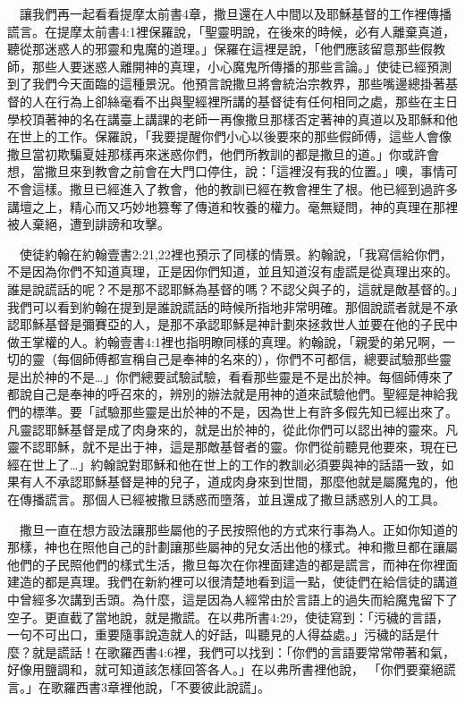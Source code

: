 \documentclass{book}
\begin{document}
　讓我們再一起看看提摩太前書4章，撒旦還在人中間以及耶穌基督的工作裡傳播謊言。在提摩太前書4:1裡保羅說，「聖靈明說，在後來的時候，必有人離棄真道，聽從那迷惑人的邪靈和鬼魔的道理。」保羅在這裡是說，「他們應該留意那些假教師，那些人要迷惑人離開神的真理，小心魔鬼所傳播的那些言論。」使徒已經預測到了我們今天面臨的這種景況。他預言說撒旦將會統治宗教界，那些嘴邊總掛著基督的人在行為上卻絲毫看不出與聖經裡所講的基督徒有任何相同之處，那些在主日學校頂著神的名在講臺上講課的老師一再像撒旦那樣否定著神的真道以及耶穌和他在世上的工作。保羅說，「我要提醒你們小心以後要來的那些假師傅，這些人會像撒旦當初欺騙夏娃那樣再來迷惑你們，他們所教訓的都是撒旦的道。」你或許會想，當撒旦來到教會之前會在大門口停住，說：「這裡沒有我的位置。」噢，事情可不會這樣。撒旦已經進入了教會，他的教訓已經在教會裡生了根。他已經到過許多講壇之上，精心而又巧妙地篡奪了傳道和牧養的權力。毫無疑問，神的真理在那裡被人棄絕，遭到誹謗和攻擊。

　使徒約翰在約翰壹書2:21,22裡也預示了同樣的情景。約翰說，「我寫信給你們，不是因為你們不知道真理，正是因你們知道，並且知道沒有虛謊是從真理出來的。誰是說謊話的呢？不是那不認耶穌為基督的嗎？不認父與子的，這就是敵基督的。」我們可以看到約翰在提到是誰說謊話的時候所指地非常明確。那個說謊者就是不承認耶穌基督是彌賽亞的人，是那不承認耶穌是神計劃來拯救世人並要在他的子民中做王掌權的人。約翰壹書4:1裡也指明瞭同樣的真理。約翰說，「親愛的弟兄啊，一切的靈（每個師傅都宣稱自己是奉神的名來的），你們不可都信，總要試驗那些靈是出於神的不是…」你們總要試驗試驗，看看那些靈是不是出於神。每個師傅來了都說自己是奉神的呼召來的，辨別的辦法就是用神的道來試驗他們。聖經是神給我們的標準。要「試驗那些靈是出於神的不是，因為世上有許多假先知已經出來了。凡靈認耶穌基督是成了肉身來的，就是出於神的，從此你們可以認出神的靈來。凡靈不認耶穌，就不是出于神，這是那敵基督者的靈。你們從前聽見他要來，現在已經在世上了…」約翰說對耶穌和他在世上的工作的教訓必須要與神的話語一致，如果有人不承認耶穌基督是神的兒子，道成肉身來到世間，那麼他就是屬魔鬼的，他在傳播謊言。那個人已經被撒旦誘惑而墮落，並且還成了撒旦誘惑別人的工具。

　撒旦一直在想方設法讓那些屬他的子民按照他的方式來行事為人。正如你知道的那樣，神也在照他自己的計劃讓那些屬神的兒女活出他的樣式。神和撒旦都在讓屬他們的子民照他們的樣式生活，撒旦每次在你裡面建造的都是謊言，而神在你裡面建造的都是真理。我們在新約裡可以很清楚地看到這一點，使徒們在給信徒的講道中曾經多次講到舌頭。為什麼，這是因為人經常由於言語上的過失而給魔鬼留下了空子。更直截了當地說，就是撒謊。在以弗所書4:29，使徒寫到：「污穢的言語，一句不可出口，重要隨事說造就人的好話，叫聽見的人得益處。」污穢的話是什麼？就是謊話！在歌羅西書4:6裡，我們可以找到：「你們的言語要常常帶著和氣，好像用鹽調和，就可知道該怎樣回答各人。」在以弗所書裡他說， 「你們要棄絕謊言。」在歌羅西書3章裡他說，「不要彼此說謊」。
\end{document}
